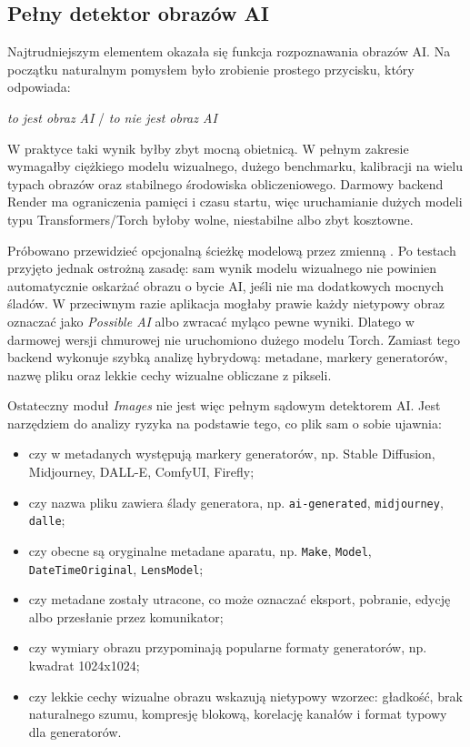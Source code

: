 \documentclass[12pt,a4paper]{article}
\begin{document}
\subsection{Pełny detektor obrazów AI}
Najtrudniejszym elementem okazała się funkcja rozpoznawania obrazów AI.
Na początku naturalnym pomysłem było zrobienie prostego przycisku, który odpowiada:
\begin{center}
\textit{to jest obraz AI} / \textit{to nie jest obraz AI}
\end{center}
W praktyce taki wynik byłby zbyt mocną obietnicą.
W pełnym zakresie wymagałby ciężkiego modelu wizualnego, dużego benchmarku, kalibracji na wielu typach obrazów oraz stabilnego środowiska obliczeniowego.
Darmowy backend Render ma ograniczenia pamięci i czasu startu, więc uruchamianie dużych modeli typu Transformers/Torch byłoby wolne, niestabilne albo zbyt kosztowne.

Próbowano przewidzieć opcjonalną ścieżkę modelową przez zmienną .
Po testach przyjęto jednak ostrożną zasadę: sam wynik modelu wizualnego nie powinien automatycznie oskarżać obrazu o bycie AI, jeśli nie ma dodatkowych mocnych śladów.
W przeciwnym razie aplikacja mogłaby prawie każdy nietypowy obraz oznaczać jako \textit{Possible AI} albo zwracać myląco pewne wyniki.
Dlatego w darmowej wersji chmurowej nie uruchomiono dużego modelu Torch.
Zamiast tego backend wykonuje szybką analizę hybrydową: metadane, markery generatorów, nazwę pliku oraz lekkie cechy wizualne obliczane z pikseli.

Ostateczny moduł \textit{Images} nie jest więc pełnym sądowym detektorem AI.
Jest narzędziem do analizy ryzyka na podstawie tego, co plik sam o sobie ujawnia:
\begin{itemize}
  \item czy w metadanych występują markery generatorów, np. Stable Diffusion, Midjourney, DALL-E, ComfyUI, Firefly;
  \item czy nazwa pliku zawiera ślady generatora, np. \texttt{ai-generated}, \texttt{midjourney}, \texttt{dalle};
  \item czy obecne są oryginalne metadane aparatu, np. \texttt{Make}, \texttt{Model}, \texttt{DateTimeOriginal}, \texttt{LensModel};
  \item czy metadane zostały utracone, co może oznaczać eksport, pobranie, edycję albo przesłanie przez komunikator;
  \item czy wymiary obrazu przypominają popularne formaty generatorów, np. kwadrat 1024x1024;
  \item czy lekkie cechy wizualne obrazu wskazują nietypowy wzorzec: gładkość, brak naturalnego szumu, kompresję blokową, korelację kanałów i format typowy dla generatorów.
\end{itemize}
\end{document}
